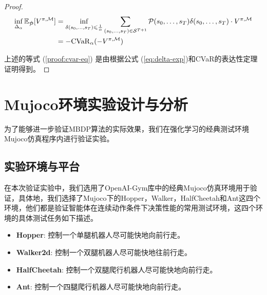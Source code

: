 \begin{proof}
\begin{align}
    \inf\limits_{\Delta_\alpha}\mathbb{E}_{\hat{\mathcal{P}}}[V^{\pi,\mathcal{M}}] &= \inf\limits_{\delta(s_0,\ldots,s_T)\leq\frac{1}{\alpha}}\sum_{(s_0,\ldots,s_T)\in\mathcal{S}^{T+1}}\mathcal{P}(s_0,\ldots,s_T)\delta(s_0,\ldots,s_T)\cdot V^{\pi,\mathcal{M}}\notag\\
    &=-\mathrm{CVaR}_\alpha(-V^{\pi,\mathcal{M}})\label{proof:cvar-eq}
\end{align}

上述的等式 (\ref{proof:cvar-eq}) 是由根据公式 (\ref{eq:delta-exp})和CVaR的表达性定理证明得到。

\end{proof}

\section{Mujoco环境实验设计与分析}

为了能够进一步验证MBDP算法的实际效果，我们在强化学习的经典测试环境Mujoco仿真程序内进行验证实验。

\subsection{实验环境与平台}

在本次验证实验中，我们选用了OpenAI-Gym库中的经典Mujoco仿真环境\cite{todorov2012mujoco}用于验证，具体地，我们选择了Mujoco下的Hopper，Walker，HalfCheetah和Ant这四个环境，他们都是验证智能体在连续动作条件下决策性能的常用测试环境，这四个环境的具体测试任务如下描述。

\begin{itemize}
    \item \textbf{Hopper}: 控制一个单腿机器人尽可能快地向前行走。
    \item \textbf{Walker2d}: 控制一个双腿机器人尽可能快地往前行走。
    \item \textbf{HalfCheetah}: 控制一个双腿爬行机器人尽可能快地向前行走。
    \item \textbf{Ant}: 控制一个四腿爬行机器人尽可能快地向前行走。
\end{itemize}

